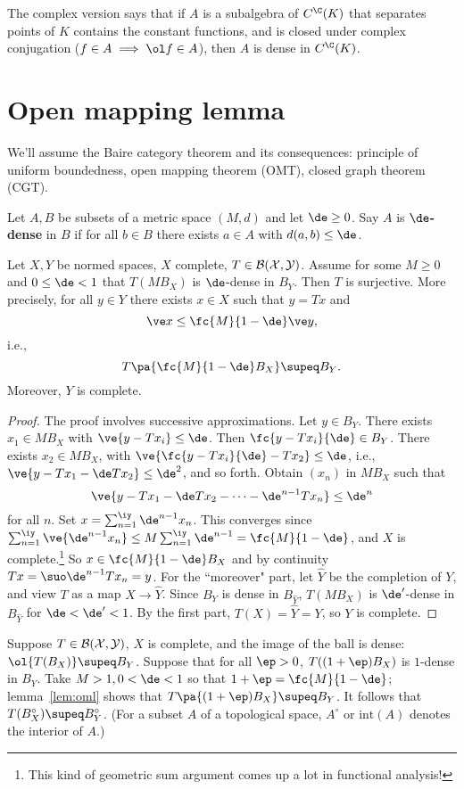 \begin{rem}
The complex version says that if $A$ is a subalgebra of $C^{\C}(K)$ that separates points of $K$ contains the constant functions, and is closed under complex conjugation ($f\in A\implies \ol f\in A$), then $A$ is dense in $C^{\C}(K)$.
\end{rem}
\section{Open mapping lemma}
We'll assume the Baire category theorem and its consequences: principle of uniform boundedness, open mapping theorem (OMT), closed graph theorem (CGT). 
\begin{df}
Let $A,B$ be subsets of a metric space $(M,d)$ and let $\de\ge 0$. Say $A$ is \textbf{$\de$-dense} in $B$ if for all $b\in B$ there exists $a\in A$ with $d(a,b)\le \de$.
\end{df}
\begin{lem}
Let $X,Y$ be normed spaces, $X$ complete, $T\in \cal B(X,Y)$. Assume for some $M\ge 0$ and $0\le \de<1$ that $T(MB_X)$ is $\de$-dense in $B_Y$. Then $T$ is surjective. 
More precisely, 
for all $y\in Y$ there exists $x\in X$ such that $y=Tx$ and
\[
\ve x\le \fc{M}{1-\de}\ve y,
\]
i.e.,
\[
T\pa{\fc{M}{1-\de}B_X}\supeq B_Y.
\]
Moreover, $Y$ is complete.
\end{lem}
\begin{proof}
The proof involves successive approximations. 
Let $y\in B_Y$. There exists $x_1\in MB_X$ with $\ve{y-Tx_i}\le \de$. Then $\fc{y-Tx_i}{\de}\in B_Y$. There exists $x_2\in MB_X$, with $\ve{\fc{y-Tx_i}{\de}-Tx_2}\le \de$, i.e., $\ve{y-Tx_1-\de Tx_2}\le \de^2$, and so forth. Obtain $(x_n)$ in $MB_X$ such that 
\[
\ve{y-Tx_1-\de Tx_2-\cdots -\de^{n-1} Tx_n}\le \de^n
\]
for all $n$. Set $x=\sum_{n=1}^{\iy} \de^{n-1} x_n$. This converges since $\sum_{n=1}^{\iy}\ve{\de^{n-1}x_n}\le M\sum_{n=1}^{\iy}\de^{n-1}=\fc{M}{1-\de}$, and $X$ is complete.\footnote{This kind of geometric sum argument comes up a lot in functional analysis!} 
So $x\in \fc{M}{1-\de}B_X$ and  by continuity $Tx=\suo \de^{n-1} Tx_n=y$. For the ``moreover" part, let $\hat Y$ be the completion of $Y$, and view 
$T$ as a map $X\to \hat Y$. Since $B_Y$ is dense in $B_{\hat Y}$, $T(MB_X)$ is $\de'$-dense in $B_{\hat Y}$ for $\de<\de'<1$. By the first part, $T(X)=\hat Y=Y$, so $Y$ is complete.
\end{proof}
\begin{rem}
Suppose $T\in\cal B(X,Y)$, $X$ is complete, and the image of the ball is dense: $\ol{T(B_X)}\supeq B_Y$. Suppose that for all $\ep>0$, $T((1+\ep)B_X)$ is $1$-dense in $B_Y$. Take $M>1,0< \de<1$ so that $1+\ep=\fc{M}{1-\de}$;  lemma~\ref{lem:oml} shows that  $T\pa{(1+\ep)B_X}\supeq B_Y$. It follows that $T(B_X^{\circ})\supeq B_Y^{\circ}$. (For a subset $A$ of a topological space, $A^{\circ}$ or $\text{int}(A)$ denotes the interior of $A$.)
\end{rem}

